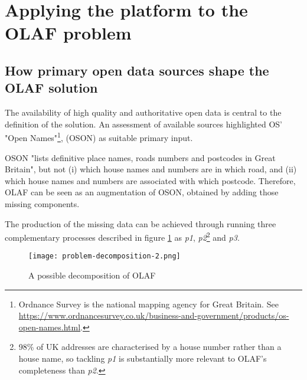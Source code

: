 \section{Applying the platform to the OLAF problem}
\label{crowdsourcing-olaf}

\subsection{How primary open data sources shape the OLAF solution}

The availability of high quality and authoritative open data is central to the definition of the solution. An assessment of available sources highlighted OS' "Open Names"\footnote{Ordnance Survey is the national mapping agency for Great Britain. See \url{https://www.ordnancesurvey.co.uk/business-and-government/products/os-open-names.html}.}, (OSON) as suitable primary input. 

OSON "lists definitive place names, roads numbers and postcodes in Great Britain", but not (i) which house names and numbers are in which road, and (ii) which house names and numbers are associated with which postcode. Therefore, OLAF can be seen as an augmentation of OSON, obtained by adding those missing components.

The production of the missing data can be achieved through running three complementary processes described in figure \ref{fig:problem_decomposition_2} as {\it p1}, {\it p2}\footnote{98\% of UK addresses are characterised by a house number rather than a house name, so tackling {\it p1} is substantially more relevant to OLAF's completeness than {\it p2}.} and {\it p3}. 

\begin{figure}
	\texttt{[image: problem-decomposition-2.png]}
	\caption{A possible decomposition of OLAF}
	\label{fig:problem_decomposition_2}
\end{figure}

